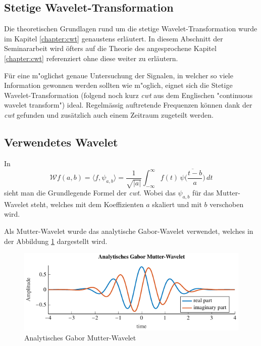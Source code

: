 \begin{refsection}
\newpage
\section{Stetige Wavelet-Transformation}
Die theoretischen Grundlagen rund um die stetige Wavelet-Transformation wurde im Kapitel \ref{chapter:cwt} genaustens erläutert. 
In diesem Abschnitt der Seminararbeit wird öfters auf die Theorie des angesprochene Kapitel \ref{chapter:cwt} referenziert ohne diese weiter zu erläutern. 

Für eine m"oglichst genaue Untersuchung der Signalen, in welcher so viele Information gewonnen werden sollten wie m"oglich, eignet sich die Stetige Wavelet-Transformation (folgend noch kurz \textit{cwt} aus dem Englischen "continuous wavelet transform")
ideal. 
Regelmässig auftretende Frequenzen können dank der \textit{cwt} gefunden und zusätzlich auch einem Zeitraum zugeteilt werden.
\subsection{Verwendetes Wavelet}
In
\begin{equation}
\mathcal{W}f (a,b)
=
\langle f,\psi_{a,b}\rangle
=
\frac{1}{\sqrt{|a|}}\int_{-\infty}^\infty f(t)\,\overline{
	\psi\biggl(\frac{t-b}{a}\biggr)}\,dt
\label{eq:cwt}
\end{equation}
sieht man die Grundlegende Formel der \textit{cwt}.
Wobei das $\psi_{a,b}$ für das Mutter-Wavelet steht, welches mit dem Koeffizienten $a$ skaliert und mit $b$ verschoben wird.

Als Mutter-Wavelet wurde das analytische Gabor-Wavelet verwendet, welches in der Abbildung \ref{fig:gabor_plot} \space dargestellt wird.
\begin{figure}
\centering
\includegraphics[width=1\textwidth]{papers/wwt/images/gabor.pdf}
\caption{Analytisches Gabor Mutter-Wavelet}
\label{fig:gabor_plot}
\end{figure}


\end{refsection}
